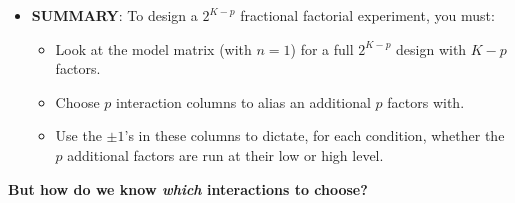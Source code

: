 \begin{itemize}
    \item \textbf{SUMMARY}: To design a $ 2^{K-p} $ fractional factorial experiment, you must:
          \begin{itemize}[*]
              \item Look at the model matrix (with $ n=1 $) for a full $ 2^{K-p} $ design with $ K-p $ factors.
              \item Choose $ p $ interaction columns to alias an additional $ p $ factors with.
              \item Use the $ \pm 1 $'s in these columns to dictate, for each condition, whether the $p$ additional factors are
                    run at their low or high level.
          \end{itemize}
\end{itemize}
\begin{framed}
    \begin{tightcenter}
        \textbf{But how do we know \emph{which} interactions to choose?}
    \end{tightcenter}
\end{framed}
